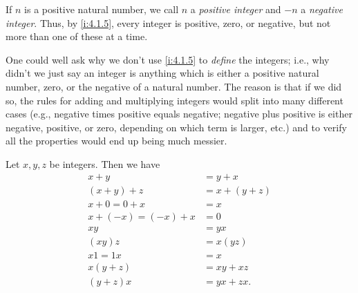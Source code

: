 \begin{note}
  If \(n\) is a positive natural number, we call \(n\) a \emph{positive integer} and \(-n\) a \emph{negative integer}.
  Thus, by \cref{i:4.1.5}, every integer is positive, zero, or negative, but not more than one of these at a time.
\end{note}

\begin{note}
  One could well ask why we don't use \cref{i:4.1.5} to \emph{define} the integers;
  i.e., why didn't we just say an integer is anything which is either a positive natural number, zero, or the negative of a natural number.
  The reason is that if we did so, the rules for adding and multiplying integers would split into many different cases (e.g., negative times positive equals negative; negative plus positive is either negative, positive, or zero, depending on which term is larger, etc.) and to verify all the properties would end up being much messier.
\end{note}

\begin{prop}\label{i:4.1.6}
  Let \(x, y, z\) be integers.
  Then we have
  \begin{align*}
    x + y               & = y + x       \\
    (x + y) + z         & = x + (y + z) \\
    x + 0 = 0 + x       & = x           \\
    x + (-x) = (-x) + x & = 0           \\
    xy                  & = yx          \\
    (xy)z               & = x(yz)       \\
    x1 = 1x             & = x           \\
    x(y + z)            & = xy + xz     \\
    (y + z)x            & = yx + zx.
  \end{align*}
\end{prop}

